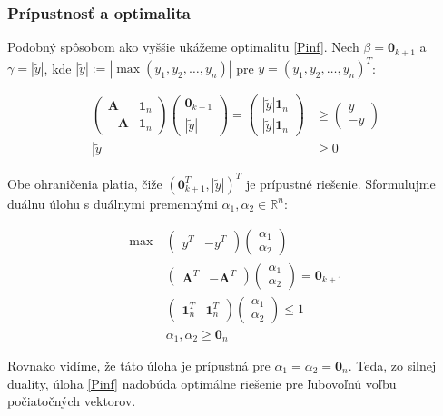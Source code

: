 \documentclass[report.tex]{subfiles}
\begin{document}
\newpage

\subsubsection{Prípustnosť a optimalita}\label{sec:InfOptim}

Podobný spôsobom ako vyššie ukážeme optimalitu \eqref{Pinf}. Nech $\beta = \mathbf{0}_{k+1}$ a $\gamma = |\tilde{y}|$, kde $|\tilde{y}| := |\max(y_1, y_2, \dots, y_n)|$ pre $y = (y_1, y_2, \dots, y_n)^T$:

\begin{align*}
	\left(
	\begin{array}{c|c}
		\mathbf{A} & \mathbf{1}_n \\
		\hline
		-\mathbf{A} & \mathbf{1}_n
	\end{array}
	\right)
	\left(
	\begin{array}{c}
		\mathbf{0}_{k+1} \\
		\hline
		|\tilde{y}|
	\end{array}
	\right)
	=
	\left(
		\begin{array}{c}
			|\tilde{y}| \mathbf{1}_n \\
			\hline
			|\tilde{y}| \mathbf{1}_n
		\end{array}
	\right)
	&\geq
	\left(
		\begin{array}{c}
			y \\
			\hline
			-y
		\end{array}
	\right) \\
	|\tilde{y}| &\geq 0 
\end{align*}

Obe ohraničenia platia, čiže $(\mathbf{0}_{k+1}^T, |\tilde{y}|)^T$ je prípustné riešenie. Sformulujme duálnu úlohu s duálnymi premennými $\alpha_1, \alpha_2 \in \mathbb{R}^n$:

\begin{align*}
	\text{max}~ &
	\left(
		\begin{array}{c|c}
			y^T & -y^T
		\end{array}
	\right)
	\left(
		\begin{array}{c}
			\alpha_1 \\
			\hline
			\alpha_2
		\end{array}
	\right) \\
	&\left(
		\begin{array}{c|c}
			\mathbf{A}^T & -\mathbf{A}^T
		\end{array}
	\right)
	\left(
		\begin{array}{c}
			\alpha_1 \\
			\hline
			\alpha_2
		\end{array}
	\right)
	=
	\mathbf{0}_{k+1} \\
	&\left(
		\begin{array}{c|c}
			\mathbf{1}_n^T & \mathbf{1}_n^T
		\end{array}
	\right)
	\left(
		\begin{array}{c}
			\alpha_1 \\
			\hline
			\alpha_2
		\end{array}
	\right)
	\leq
	1 \\
	&\alpha_1, \alpha_2 \geq \mathbf{0}_{n} 
\end{align*}

Rovnako vidíme, že táto úloha je prípustná pre $\alpha_1 = \alpha_2 = \mathbf{0}_n$. Teda, zo silnej duality, úloha \eqref{Pinf} nadobúda optimálne riešenie pre ľubovoľnú voľbu počiatočných vektorov.
\end{document}

